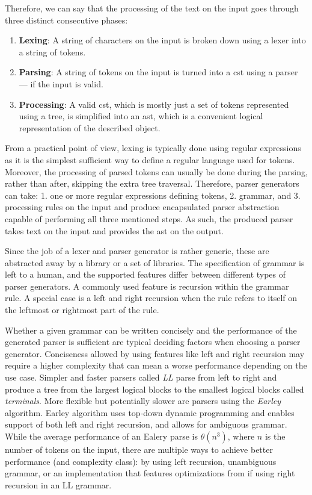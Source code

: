 Therefore, we can say that the processing of the text on the input goes through three distinct consecutive phases:

\begin{enumerate}
    \item \textbf{Lexing}: A string of characters on the input is broken down using a lexer into a string of tokens.
    \item \textbf{Parsing}: A string of tokens on the input is turned into a \gls{cst} using a parser --- if the input is valid.
    \item \textbf{Processing}: A valid \gls{cst}, which is mostly just a set of tokens represented using a tree, is simplified into an \gls{ast}, which is a convenient logical representation of the described object.
\end{enumerate}

From a practical point of view, lexing is typically done using regular expressions as it is the simplest sufficient way to define a regular language used for tokens.
Moreover, the processing of parsed tokens can usually be done during the parsing, rather than after, skipping the extra tree traversal.
Therefore, parser generators can take: 1. one or more regular expressions defining tokens, 2. grammar, and 3. processing rules on the input and produce encapsulated parser abstraction capable of performing all three mentioned steps.
As such, the produced parser takes text on the input and provides the \gls{ast} on the output.

Since the job of a lexer and parser generator is rather generic, these are abstracted away by a library or a set of libraries.
The specification of grammar is left to a human, and the supported features differ between different types of parser generators.
A commonly used feature is recursion within the grammar rule.
A special case is a left and right recursion when the rule refers to itself on the leftmost or rightmost part of the rule.

Whether a given grammar can be written concisely and the performance of the generated parser is sufficient are typical deciding factors when choosing a parser generator.
Conciseness allowed by using features like left and right recursion may require a higher complexity that can mean a worse performance depending on the use case.
Simpler and faster parsers called \emph{LL} parse from left to right and produce a tree from the largest logical blocks to the smallest logical blocks called \emph{terminals}.
More flexible but potentially slower are parsers using the \emph{Earley} algorithm.
Earley algorithm uses top-down dynamic programming and enables support of both left and right recursion, and allows for ambiguous grammar.
While the average performance of an Ealery parse is $\theta(n^3)$, where $n$ is the number of tokens on the input, there are multiple ways to achieve better performance (and complexity class): by using left recursion, unambiguous grammar, or an implementation that features optimizations from \textcite{leo_general_1991} if using right recursion in an LL grammar.
